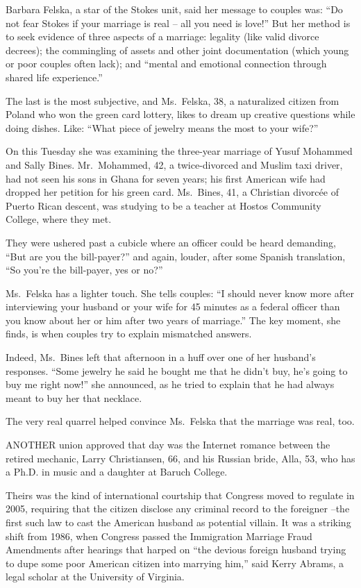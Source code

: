 ﻿\documentclass[12pt]{article}
\begin{document}
Barbara Felska, a star of the Stokes unit, said her message to couples was: ``Do not fear Stokes if
your marriage is real -- all you need is love!'' But her method is to seek evidence of three aspects
of a marriage: legality (like valid divorce decrees); the commingling of assets and other joint
documentation (which young or poor couples often lack); and ``mental and emotional connection
through shared life experience.''

The last is the most subjective, and Ms.~Felska, 38, a naturalized citizen from Poland who won the
green card lottery, likes to dream up creative questions while doing dishes. Like: ``What piece of
jewelry means the most to your wife?''

On this Tuesday she was examining the three-year marriage of Yusuf Mohammed and Sally Bines.
Mr.~Mohammed, 42, a twice-divorced and Muslim taxi driver, had not seen his sons in Ghana for seven
years; his first American wife had dropped her petition for his green card. Ms.~Bines, 41, a
Christian divorc\'ee of Puerto Rican descent, was studying to be a teacher at Hostos Community
College, where they met.

They were ushered past a cubicle where an officer could be heard demanding, ``But are you the
bill-payer?'' and again, louder, after some Spanish translation, ``So you're the bill-payer, yes or
no?''

Ms.~Felska has a lighter touch. She tells couples: ``I should never know more after interviewing
your husband or your wife for 45 minutes as a federal officer than you know about her or him after
two years of marriage.'' The key moment, she finds, is when couples try to explain mismatched
answers.

Indeed, Ms.~Bines left that afternoon in a huff over one of her husband's responses. ``Some jewelry
he said he bought me that he didn't buy, he's going to buy me right now!'' she announced, as he
tried to explain that he had always meant to buy her that necklace.

The very real quarrel helped convince Ms.~Felska that the marriage was real, too.

ANOTHER union approved that day was the Internet romance between the retired mechanic, Larry
Christiansen, 66, and his Russian bride, Alla, 53, who has a Ph.D. in music and a daughter at Baruch
College.

Theirs was the kind of international courtship that Congress moved to regulate in 2005, requiring
that the citizen disclose any criminal record to the foreigner --the first such law to cast the
American husband as potential villain. It was a striking shift from 1986, when Congress passed the
Immigration Marriage Fraud Amendments after hearings that harped on ``the devious foreign husband
trying to dupe some poor American citizen into marrying him,'' said Kerry Abrams, a legal scholar at
the University of Virginia.
\end{document}
